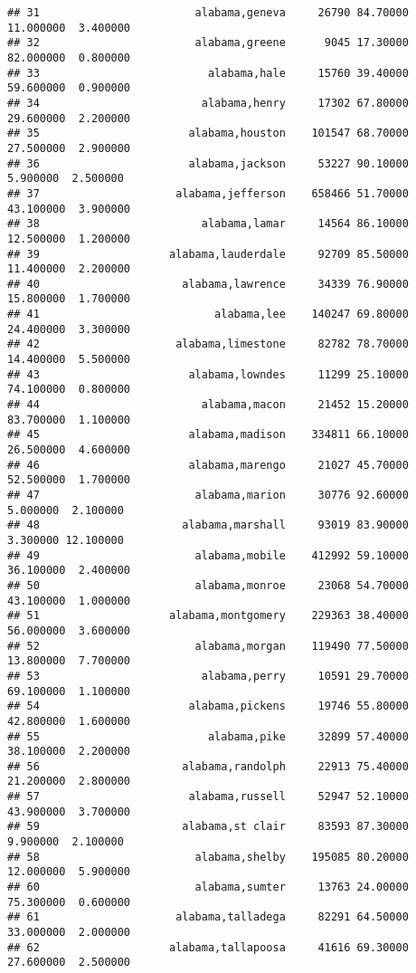 \documentclass[
]{article}
\begin{document}
\begin{verbatim}
## 31                        alabama,geneva     26790 84.70000 11.000000  3.400000
## 32                        alabama,greene      9045 17.30000 82.000000  0.800000
## 33                          alabama,hale     15760 39.40000 59.600000  0.900000
## 34                         alabama,henry     17302 67.80000 29.600000  2.200000
## 35                       alabama,houston    101547 68.70000 27.500000  2.900000
## 36                       alabama,jackson     53227 90.10000  5.900000  2.500000
## 37                     alabama,jefferson    658466 51.70000 43.100000  3.900000
## 38                         alabama,lamar     14564 86.10000 12.500000  1.200000
## 39                    alabama,lauderdale     92709 85.50000 11.400000  2.200000
## 40                      alabama,lawrence     34339 76.90000 15.800000  1.700000
## 41                           alabama,lee    140247 69.80000 24.400000  3.300000
## 42                     alabama,limestone     82782 78.70000 14.400000  5.500000
## 43                       alabama,lowndes     11299 25.10000 74.100000  0.800000
## 44                         alabama,macon     21452 15.20000 83.700000  1.100000
## 45                       alabama,madison    334811 66.10000 26.500000  4.600000
## 46                       alabama,marengo     21027 45.70000 52.500000  1.700000
## 47                        alabama,marion     30776 92.60000  5.000000  2.100000
## 48                      alabama,marshall     93019 83.90000  3.300000 12.100000
## 49                        alabama,mobile    412992 59.10000 36.100000  2.400000
## 50                        alabama,monroe     23068 54.70000 43.100000  1.000000
## 51                    alabama,montgomery    229363 38.40000 56.000000  3.600000
## 52                        alabama,morgan    119490 77.50000 13.800000  7.700000
## 53                         alabama,perry     10591 29.70000 69.100000  1.100000
## 54                       alabama,pickens     19746 55.80000 42.800000  1.600000
## 55                          alabama,pike     32899 57.40000 38.100000  2.200000
## 56                      alabama,randolph     22913 75.40000 21.200000  2.800000
## 57                       alabama,russell     52947 52.10000 43.900000  3.700000
## 59                      alabama,st clair     83593 87.30000  9.900000  2.100000
## 58                        alabama,shelby    195085 80.20000 12.000000  5.900000
## 60                        alabama,sumter     13763 24.00000 75.300000  0.600000
## 61                     alabama,talladega     82291 64.50000 33.000000  2.000000
## 62                    alabama,tallapoosa     41616 69.30000 27.600000  2.500000

\end{verbatim}
\end{document}
